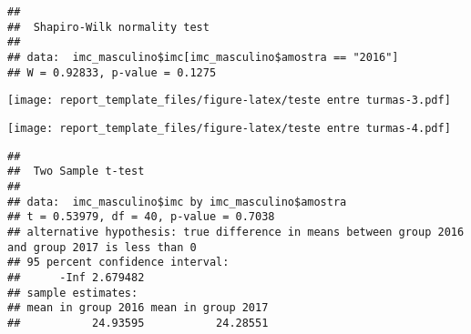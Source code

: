 \documentclass[
]{article}
\newenvironment{Shaded}{\begin{snugshade}}{\end{snugshade}}
\newcommand{\AttributeTok}[1]{\textcolor[rgb]{0.13,0.29,0.53}{#1}}
\newcommand{\ConstantTok}[1]{\textcolor[rgb]{0.56,0.35,0.01}{#1}}
\newcommand{\DecValTok}[1]{\textcolor[rgb]{0.00,0.00,0.81}{#1}}
\newcommand{\FloatTok}[1]{\textcolor[rgb]{0.00,0.00,0.81}{#1}}
\newcommand{\FunctionTok}[1]{\textcolor[rgb]{0.13,0.29,0.53}{\textbf{#1}}}
\newcommand{\NormalTok}[1]{#1}
\newcommand{\SpecialCharTok}[1]{\textcolor[rgb]{0.81,0.36,0.00}{\textbf{#1}}}
\newcommand{\StringTok}[1]{\textcolor[rgb]{0.31,0.60,0.02}{#1}}
\begin{document}
\begin{verbatim}
## 
##  Shapiro-Wilk normality test
## 
## data:  imc_masculino$imc[imc_masculino$amostra == "2016"]
## W = 0.92833, p-value = 0.1275
\end{verbatim}

\begin{Shaded}
\end{Shaded}

\texttt{[image: report\_template\_files/figure-latex/teste entre turmas-3.pdf]}

\begin{Shaded}
\end{Shaded}

\texttt{[image: report\_template\_files/figure-latex/teste entre turmas-4.pdf]}

\begin{Shaded}
\end{Shaded}

\begin{verbatim}
## 
##  Two Sample t-test
## 
## data:  imc_masculino$imc by imc_masculino$amostra
## t = 0.53979, df = 40, p-value = 0.7038
## alternative hypothesis: true difference in means between group 2016 and group 2017 is less than 0
## 95 percent confidence interval:
##      -Inf 2.679482
## sample estimates:
## mean in group 2016 mean in group 2017 
##           24.93595           24.28551
\end{verbatim}
\end{document}

